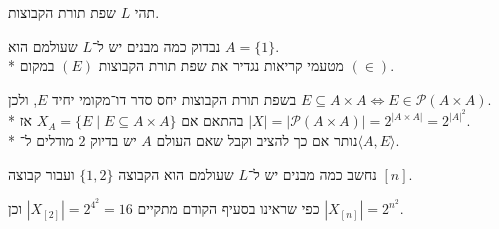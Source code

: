 \question{}
תהי $L$ שפת תורת הקבוצות.

\subquestion{}
נבדוק כמה מבנים יש ל־$L$ שעולמם הוא $A = \{1\}$. \\*
מטעמי קריאות נגדיר את שפת תורת הקבוצות $(E)$ במקום $(\in)$.
\begin{solution}
	בשפת תורת הקבוצות יחס סדר דו־מקומי יחיד $E$, ולכן $E \subseteq A \times A \iff E \in \mathcal{P}(A \times A)$. \\*
	בהתאם אם $X_A = \{ E \mid E \subseteq A \times A \}$ אז $|X| = |\mathcal{P}(A \times A)| = 2^{|A \times A|} = 2^{{|A|}^2}$. \\*
	נותר אם כך להציב וקבל שאם העולם $A$ יש בדיוק $2$ מודלים ל־$\langle A, E \rangle$.
\end{solution}

\subquestion{}
נחשב כמה מבנים יש ל־$L$ שעולמם הוא הקבוצה $\{1, 2\}$ ועבור קבוצה $[n]$.
\begin{solution}
	כפי שראינו בסעיף הקודם מתקיים $|X_{[2]}| = 2^{4^2} = 16$ וכן $|X_{[n]}| = 2^{n^2}$.
\end{solution}



